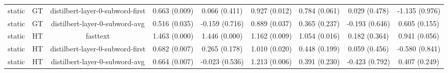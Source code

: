 \begin{sidewaystable}[htb]
\begin{tabular}{@{}ccccccccc@{}}
        static & GT & distilbert-layer-0-subword-first & 0.663 (0.009) & 0.066 (0.411) & 0.927 (0.012) & 0.784 (0.061) & 0.029 (0.478) & -1.135 (0.976) \\
        static & GT & distilbert-layer-0-subword-avg & 0.516 (0.035) & -0.159 (0.716) & 0.889 (0.037) & 0.365 (0.237) & -0.193 (0.646) & 0.605 (0.155) \\
        static & HT & fasttext & 1.463 (0.000) & 1.446 (0.000) & 1.162 (0.009) & 1.054 (0.016) & 0.182 (0.364) & 0.941 (0.056) \\
        static & HT & distilbert-layer-0-subword-first & 0.682 (0.007) & 0.265 (0.178) & 1.010 (0.020) & 0.448 (0.199) & 0.059 (0.456) & -0.580 (0.841) \\
        static & HT & distilbert-layer-0-subword-avg & 0.664 (0.007) & -0.023 (0.536) & 1.213 (0.006) & 0.391 (0.230) & -0.423 (0.792) & 0.407 (0.249) \\
        \bottomrule
    \end{tabular}
\end{sidewaystable}